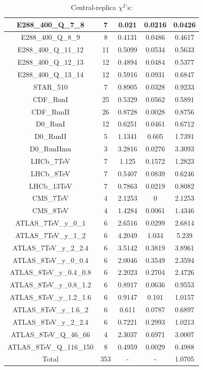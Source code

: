 \documentclass[
]{article}
\begin{document}
\begin{table}[h]
\begin{tabular}{|c|c|c|c|c|}
E288\_400\_Q\_7\_8 & 7 & 0.021 & 0.0216 & 0.0426 \\ \hline
E288\_400\_Q\_8\_9 & 8 & 0.4131 & 0.0486 & 0.4617 \\ \hline
E288\_400\_Q\_11\_12 & 11 & 0.5099 & 0.0534 & 0.5633 \\ \hline
E288\_400\_Q\_12\_13 & 12 & 0.4894 & 0.0484 & 0.5377 \\ \hline
E288\_400\_Q\_13\_14 & 12 & 0.5916 & 0.0931 & 0.6847 \\ \hline
STAR\_510 & 7 & 0.8905 & 0.0328 & 0.9233 \\ \hline
CDF\_RunI & 25 & 0.5329 & 0.0562 & 0.5891 \\ \hline
CDF\_RunII & 26 & 0.8728 & 0.0028 & 0.8756 \\ \hline
D0\_RunI & 12 & 0.6251 & 0.0461 & 0.6712 \\ \hline
D0\_RunII & 5 & 1.1341 & 0.605 & 1.7391 \\ \hline
D0\_RunIImu & 3 & 3.2816 & 0.0276 & 3.3093 \\ \hline
LHCb\_7TeV & 7 & 1.125 & 0.1572 & 1.2823 \\ \hline
LHCb\_8TeV & 7 & 0.5407 & 0.0839 & 0.6246 \\ \hline
LHCb\_13TeV & 7 & 0.7863 & 0.0219 & 0.8082 \\ \hline
CMS\_7TeV & 4 & 2.1253 & 0 & 2.1253 \\ \hline
CMS\_8TeV & 4 & 1.4284 & 0.0061 & 1.4346 \\ \hline
ATLAS\_7TeV\_y\_0\_1 & 6 & 2.6516 & 0.0299 & 2.6814 \\ \hline
ATLAS\_7TeV\_y\_1\_2 & 6 & 4.2049 & 1.034 & 5.239 \\ \hline
ATLAS\_7TeV\_y\_2\_2.4 & 6 & 3.5142 & 0.3819 & 3.8961 \\ \hline
ATLAS\_8TeV\_y\_0\_0.4 & 6 & 2.0046 & 0.3549 & 2.3594 \\ \hline
ATLAS\_8TeV\_y\_0.4\_0.8 & 6 & 2.2023 & 0.2704 & 2.4726 \\ \hline
ATLAS\_8TeV\_y\_0.8\_1.2 & 6 & 0.8917 & 0.0636 & 0.9553 \\ \hline
ATLAS\_8TeV\_y\_1.2\_1.6 & 6 & 0.9147 & 0.101 & 1.0157 \\ \hline
ATLAS\_8TeV\_y\_1.6\_2 & 6 & 0.611 & 0.0787 & 0.6897 \\ \hline
ATLAS\_8TeV\_y\_2\_2.4 & 6 & 0.7221 & 0.2993 & 1.0213 \\ \hline
ATLAS\_8TeV\_Q\_46\_66 & 4 & 2.3037 & 0.6971 & 3.0007 \\ \hline
ATLAS\_8TeV\_Q\_116\_150 & 8 & 0.4959 & 0.0029 & 0.4988 \\ \hline
Total & 353 & - & - & 1.0705 \\ \hline

\end{tabular}

\caption{Central-replica \(\chi^2\)'s:}

\end{table}
\end{document}
